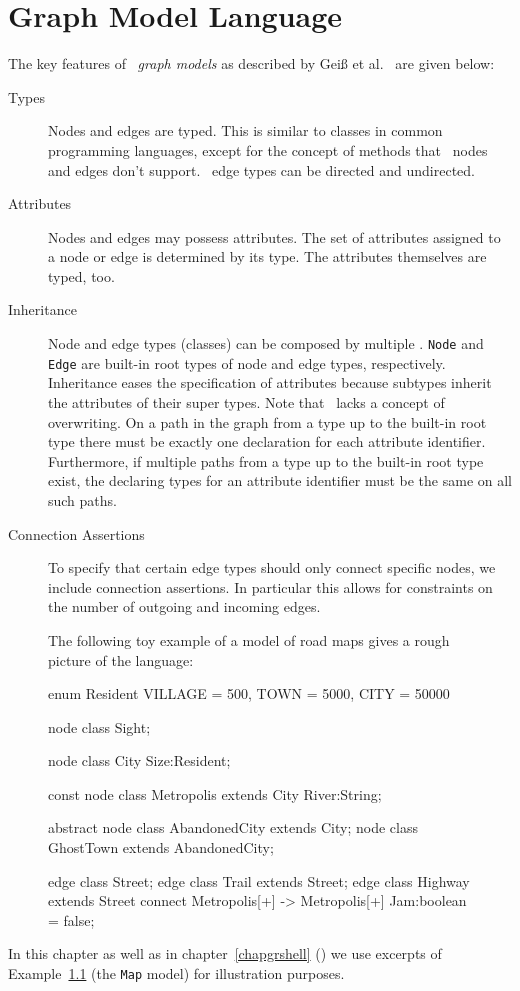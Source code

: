 \chapter{Graph Model Language}
\label{chapmodellang}
The key features of \GrG\ \emph{graph models} as described by Geiß et al.~\cite{GBGHS:06,KG:07} are given below:

\begin{description}
\item[Types] Nodes and edges are typed. 
  This is similar to classes in common programming languages, except for the concept of methods that \GrG\ nodes and edges don't support. \GrG\ edge types can be directed and undirected.
\item[Attributes] Nodes and edges may possess attributes. The set of attributes assigned to a node or edge is determined by its type. The attributes themselves are typed, too.
\item[Inheritance] Node and edge types (classes) can be composed by multiple . \texttt{Node} and \texttt{Edge} are built-in root types of node and edge types, respectively. Inheritance eases the specification of attributes because subtypes inherit the attributes of their super types. Note that \GrG\ lacks a concept of overwriting. On a path in the  graph from a type up to the built-in root type there must be exactly one declaration for each attribute identifier. Furthermore, if multiple paths from a type up to the built-in root type exist, the declaring types for an attribute identifier must be the same on all such paths.
\item[Connection Assertions] To specify that certain edge types should only connect specific nodes, we include connection assertions. In particular this allows for constraints on the number of outgoing and incoming edges.
\end{description}

\begin{figure}[htbf]
\begin{example}\label{ex:model:map}
The following toy example of a model of road maps gives a rough picture of the language:
\begin{grgen}
enum Resident {VILLAGE = 500, TOWN = 5000, CITY = 50000}

node class Sight;

node class City {
	Size:Resident;
}

const node class Metropolis extends City {
  River:String;
}  

abstract node class AbandonedCity extends City;
node class GhostTown extends AbandonedCity;

edge class Street;
edge class Trail extends Street;
edge class Highway extends Street
    connect Metropolis[+] -> Metropolis[+]
{
    Jam:boolean = false;
}
\end{grgen}
\end{example}
\end{figure}
In this chapter as well as in chapter~\ref{chapgrshell} (\GrShell) we use excerpts of Example~\ref{ex:model:map} (the \texttt{Map} model) for illustration purposes.

